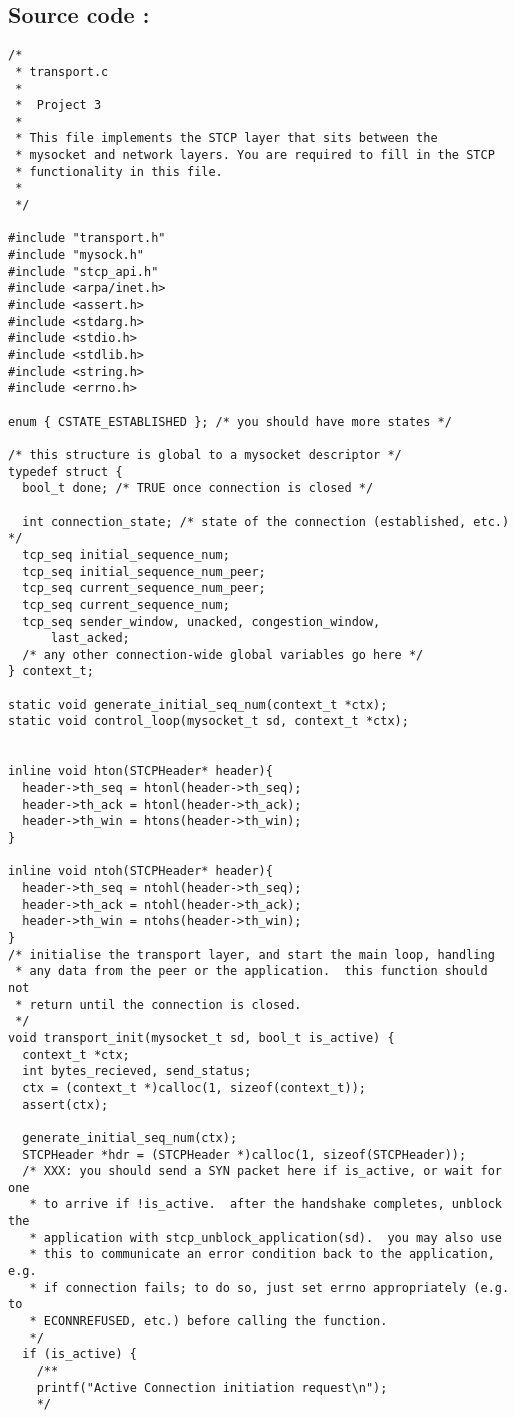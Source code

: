 \documentclass[11pt]{article}
\begin{document}
\subsection{Source code :}
\label{sec:orgheadline3}
\begin{verbatim}
/*
 * transport.c
 *
 *  Project 3
 *
 * This file implements the STCP layer that sits between the
 * mysocket and network layers. You are required to fill in the STCP
 * functionality in this file.
 *
 */

#include "transport.h"
#include "mysock.h"
#include "stcp_api.h"
#include <arpa/inet.h>
#include <assert.h>
#include <stdarg.h>
#include <stdio.h>
#include <stdlib.h>
#include <string.h>
#include <errno.h>

enum { CSTATE_ESTABLISHED }; /* you should have more states */

/* this structure is global to a mysocket descriptor */
typedef struct {
  bool_t done; /* TRUE once connection is closed */

  int connection_state; /* state of the connection (established, etc.) */
  tcp_seq initial_sequence_num;
  tcp_seq initial_sequence_num_peer;
  tcp_seq current_sequence_num_peer;
  tcp_seq current_sequence_num;
  tcp_seq sender_window, unacked, congestion_window,
      last_acked;
  /* any other connection-wide global variables go here */
} context_t;

static void generate_initial_seq_num(context_t *ctx);
static void control_loop(mysocket_t sd, context_t *ctx);


inline void hton(STCPHeader* header){
  header->th_seq = htonl(header->th_seq);
  header->th_ack = htonl(header->th_ack);
  header->th_win = htons(header->th_win);
}

inline void ntoh(STCPHeader* header){
  header->th_seq = ntohl(header->th_seq);
  header->th_ack = ntohl(header->th_ack);
  header->th_win = ntohs(header->th_win);
}
/* initialise the transport layer, and start the main loop, handling
 * any data from the peer or the application.  this function should not
 * return until the connection is closed.
 */
void transport_init(mysocket_t sd, bool_t is_active) {
  context_t *ctx;
  int bytes_recieved, send_status;
  ctx = (context_t *)calloc(1, sizeof(context_t));
  assert(ctx);

  generate_initial_seq_num(ctx);
  STCPHeader *hdr = (STCPHeader *)calloc(1, sizeof(STCPHeader));
  /* XXX: you should send a SYN packet here if is_active, or wait for one
   * to arrive if !is_active.  after the handshake completes, unblock the
   * application with stcp_unblock_application(sd).  you may also use
   * this to communicate an error condition back to the application, e.g.
   * if connection fails; to do so, just set errno appropriately (e.g. to
   * ECONNREFUSED, etc.) before calling the function.
   */
  if (is_active) {
    /**
    printf("Active Connection initiation request\n");
    */


\end{verbatim}
\end{document}

